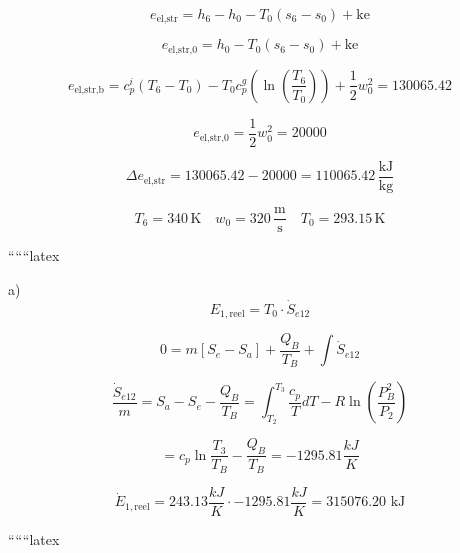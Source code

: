\[
e_{\text{el,str}} = h_6 - h_0 - T_0 (s_6 - s_0) + \text{ke}
\]

\[
e_{\text{el,str,0}} = h_0 - T_0 (s_6 - s_0) + \text{ke}
\]

\[
e_{\text{el,str,b}} = c_p^i (T_6 - T_0) - T_0 c_p^g \left( \ln \left( \frac{T_6}{T_0} \right) \right) + \frac{1}{2} w_0^2 = 130065.42
\]

\[
e_{\text{el,str,0}} = \frac{1}{2} w_0^2 = 20000
\]

\[
\Delta e_{\text{el,str}} = 130065.42 - 20000 = 110065.42 \, \frac{\text{kJ}}{\text{kg}}
\]

\[
T_6 = 340 \, \text{K} \quad w_0 = 320 \, \frac{\text{m}}{\text{s}} \quad T_0 = 293.15 \, \text{K}
\]

``````latex


a) 
\[
E_{1, \text{reel}} = T_0 \cdot \dot{S}_{e12}
\]

\[
0 = m \left[ S_e - S_a \right] + \frac{Q_B}{T_B} + \int \dot{S}_{e12}
\]

\[
\frac{\dot{S}_{e12}}{m} = S_a - S_e - \frac{Q_B}{T_B} = \int_{T_2}^{T_3} \frac{c_p}{T} dT - R \ln \left( \frac{P_B^2}{P_2} \right)
\]

\[
= c_p \ln \frac{T_3}{T_B} - \frac{Q_B}{T_B} = -1295.81 \frac{kJ}{K}
\]

\[
\dot{E}_{1, \text{reel}} = 243.13 \frac{kJ}{K} \cdot -1295.81 \frac{kJ}{K} = 315076.20 \text{ kJ}
\]

``````latex


